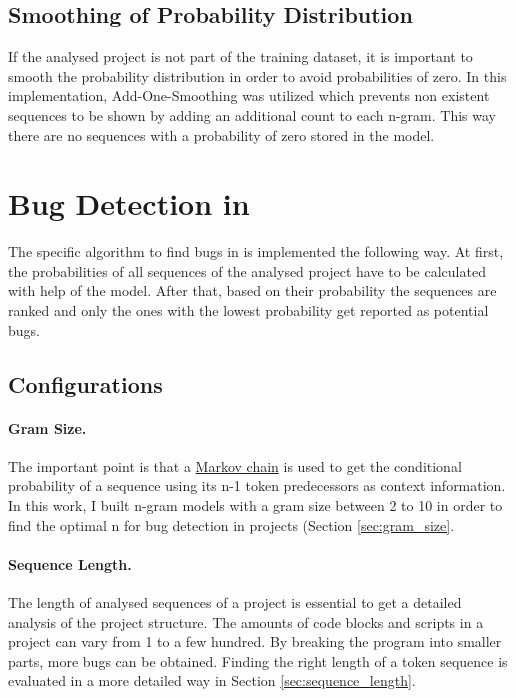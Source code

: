 \subsection{Smoothing of Probability Distribution}\label{subsec:smoothing}
If the analysed project is not part of the training dataset, it is important to smooth the probability distribution in order to avoid probabilities of zero. In this implementation, Add-One-Smoothing was utilized which prevents non existent sequences to be shown by adding an additional count to each n-gram. This way there are no sequences with a probability of zero stored in the model. 


\section{Bug Detection in \scratch{}}\label{sec:detection}
The specific algorithm to find bugs in \scratch{} is implemented the following way. At first, the probabilities of all sequences of the analysed project have to be calculated with help of the model. After that, based on their probability the sequences are ranked and only the ones with the lowest probability get reported as potential bugs. 

\subsection{Configurations}\label{subsec:configurations}

\paragraph{Gram Size.}
The important point is that a \hyperref[def:markov_chain]{Markov chain} is used to get the conditional probability of a sequence using its n-1 token predecessors as context information. In this work, I built n-gram models with a gram size between 2 to 10 in order to find the optimal n for bug detection in \scratch{} projects (Section \ref{sec:gram_size}. 
\paragraph{Sequence Length.}
The length of analysed sequences of a project is essential to get a detailed analysis of the project structure. The amounts of code blocks and scripts in a \scratch{} project can vary from 1 to a few hundred. By breaking the program into smaller parts, more bugs can be obtained. Finding the right length of a token sequence is evaluated in a more detailed way in Section \ref{sec:sequence_length}.
